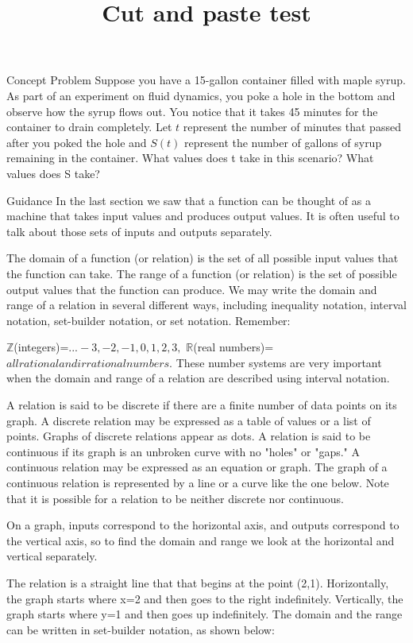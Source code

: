 \documentclass{ximera}
\title{Cut and paste test}
\begin{document}
Concept Problem
Suppose you have a 15-gallon container filled with maple syrup. As part of an experiment on fluid dynamics, you poke a hole in the bottom and observe how the syrup flows out. You notice that it takes 45 minutes for the container to drain completely. Let $t$ represent the number of minutes that passed after you poked the hole and $S(t)$ represent the number of gallons of syrup remaining in the container. What values does t take in this scenario? What values does S take?

Guidance
In the last section we saw that a function can be thought of as a machine that takes input values and produces output values. It is often useful to talk about those sets of inputs and outputs separately.

The domain of a function (or relation) is the set of all possible input values that the function can take. The range of a function (or relation) is the set of possible output values that the function can produce. We may write the domain and range of a relation in several different ways, including inequality notation, interval notation, set-builder notation, or set notation. Remember:

$\mathbb{Z}$(integers)=${...-3,-2,-1,0,1,2,3,}$
$\mathbb{R}$(real numbers)=${all rational and irrational numbers}$.
These number systems are very important when the domain and range of a relation are described using interval notation.

A relation is said to be discrete if there are a finite number of data points on its graph. A discrete relation may be expressed as a table of values or a list of points. Graphs of discrete relations appear as dots. A relation is said to be continuous if its graph is an unbroken curve with no "holes" or "gaps." A continuous relation may be expressed as an equation or graph. The graph of a continuous relation is represented by a line or a curve like the one below. Note that it is possible for a relation to be neither discrete nor continuous.

On a graph, inputs correspond to the horizontal axis, and outputs correspond to the vertical axis, so to find the domain and range we look at the horizontal and vertical separately.

 

The relation is a straight line that that begins at the point (2,1). Horizontally, the graph starts where x=2 and then goes to the right indefinitely. Vertically, the graph starts where y=1 and then goes up indefinitely. The domain and the range can be written in set-builder notation, as shown below:
\end{document}
